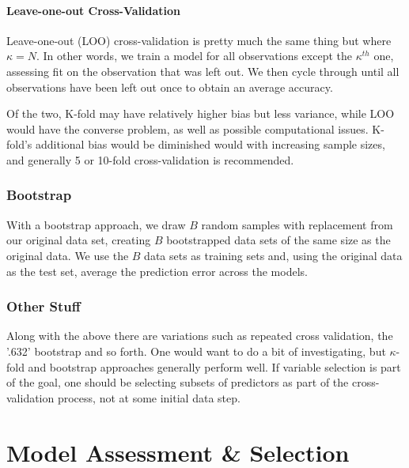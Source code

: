 \documentclass[english,nohyper,titlepage]{tufte-handout}\usepackage{knitr}
\begin{document}
\subsection{Leave-one-out Cross-Validation}
Leave-one-out (LOO) cross-validation is pretty much the same thing but where $\kappa=N$.  In other words, we train a model for all observations except the $\kappa^{th}$ one, assessing fit on the observation that was left out. We then cycle through until all observations have been left out once to obtain an average accuracy.  

Of the two, K-fold may have relatively higher bias but less variance, while LOO would have the converse problem, as well as possible computational issues.  K-fold's additional bias would be diminished would with increasing sample sizes, and generally 5 or 10-fold cross-validation is recommended.

\section{Bootstrap}
With a bootstrap approach, we draw $B$ random samples with replacement from our original data set, creating $B$ bootstrapped data sets of the same size as the original data.  We use the $B$ data sets as training sets and, using the original data as the test set, average the prediction error across the models.

\section{Other Stuff}
Along with the above there are variations such as repeated cross validation, the '.632' bootstrap and so forth.  One would want to do a bit of investigating, but $\kappa$-fold and bootstrap approaches generally perform well.  If variable selection is part of the goal, one should be selecting subsets of predictors as part of the cross-validation process, not at some initial data step.








\part{Model Assessment \& Selection}
\end{document}
